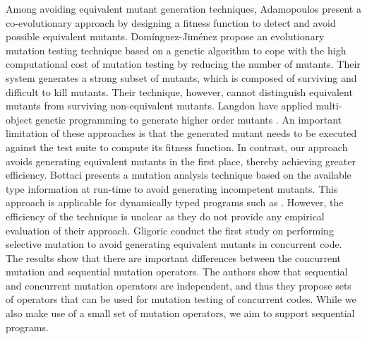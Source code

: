 Among avoiding equivalent mutant generation techniques, Adamopoulos \etal \cite{adamopoulos:gecco04} present a co-evolutionary approach by designing a fitness function to detect and avoid possible equivalent mutants.
Dom\'inguez-Jim\'enez \etal \cite{dominguez:ist11} propose an evolutionary mutation testing
technique based on a genetic algorithm to cope with the high computational cost of mutation 
testing by reducing the number of mutants. Their system generates a strong subset
of mutants, which is composed of surviving and difficult to kill mutants. 
Their technique, however, cannot distinguish equivalent mutants from surviving non-equivalent mutants.
Langdon \etal have applied multi-object genetic programming to generate higher order mutants 
\cite{langdon:jss10}.
An important limitation of these approaches is that the generated
mutant needs to be executed against the test suite to compute its fitness function.
In contrast, our approach avoids  generating equivalent mutants in the first place,
thereby achieving greater efficiency.
Bottaci \cite{bottaci:icstw10} presents a mutation analysis technique based on the available type information at run-time to avoid generating incompetent mutants. 
This approach is applicable for dynamically typed programs such as \javascript. 
However, the efficiency of the technique is unclear as they do not provide any empirical evaluation of their approach.
Gligoric \etal \cite{gligoric:issta13} conduct the first study on performing selective mutation to avoid generating equivalent mutants in concurrent code. The results show that there are important differences between the concurrent mutation and sequential mutation operators. The authors show that sequential and concurrent mutation operators are independent, and thus they propose sets of operators that can be used for mutation testing of concurrent codes. While we also make use of a small set of mutation operators, we aim to support sequential programs. 

